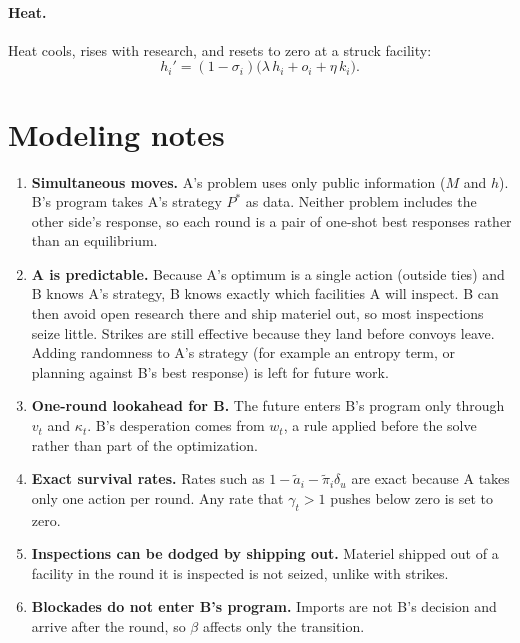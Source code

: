 \documentclass[11pt]{article}
\begin{document}
\paragraph{Heat.}
Heat cools, rises with research, and resets to zero at a struck facility:
\begin{equation}
  h_i' = ( 1 - \sigma_i ) \big( \lambda \, h_i + o_i + \eta \, k_i \big) .
\end{equation}

\section{Modeling notes}

\begin{enumerate}
  \item \textbf{Simultaneous moves.} A's problem uses only public information ($M$ and $h$). B's
        program takes A's strategy $P^*$ as data. Neither problem includes the other side's
        response, so each round is a pair of one-shot best responses rather than an equilibrium.
  \item \textbf{A is predictable.} Because A's optimum is a single action (outside ties) and B
        knows A's strategy, B knows exactly which facilities A will inspect. B can then avoid
        open research there and ship materiel out, so most inspections seize little. Strikes are
        still effective because they land before convoys leave. Adding randomness to A's
        strategy (for example an entropy term, or planning against B's best response) is left
        for future work.
  \item \textbf{One-round lookahead for B.} The future enters B's program only through $v_t$ and
        $\kappa_t$. B's desperation comes from $w_t$, a rule applied before the solve rather than
        part of the optimization.
  \item \textbf{Exact survival rates.} Rates such as $1 - \tilde a_i - \tilde\pi_i \delta_u$ are
        exact because A takes only one action per round. Any rate that $\gamma_t > 1$ pushes
        below zero is set to zero.
  \item \textbf{Inspections can be dodged by shipping out.} Materiel shipped out of a facility in
        the round it is inspected is not seized, unlike with strikes.
  \item \textbf{Blockades do not enter B's program.} Imports are not B's decision and arrive after
        the round, so $\beta$ affects only the transition.
\end{enumerate}
\end{document}
